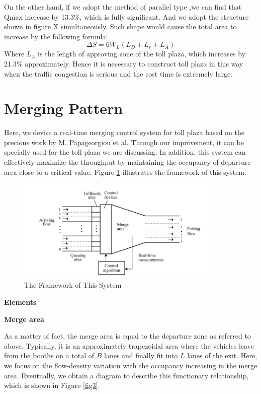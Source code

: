 \documentclass{mcmthesis}
\begin{document}
On the other hand, if we adopt the method
of parallel type ,we can find that Qmax
increase by 13.3\%, which is fully significant.
And we adopt the structure shown in figure X
simultaneously. Such shape would cause the total
area to increase by the following formula:
$$\Delta S=6W_{L}(L_D+L_r+L_A)$$
Where $L_{A}$ is the length of approving zone of
the toll plaza, which increases by 21.3\% approximately. Hence it is necessary to construct
toll plaza in this way when the traffic congestion
is serious and the cost time is extremely large.


\section{Merging Pattern}

Here, we devise a real-time merging control system for
toll plaza based on the precious work by M. Papageorgiou
et al. Through our improvement, it can be specially used
for the toll plaza we are discussing. In addition, this
system can effectively maximize the throughput by
maintaining the occupancy of departure area close to a
critical value. Figure \ref{fig2} illustrates the framework of
this system.

\begin{figure}[h]
\small
\centering
\includegraphics[width=10cm]{figure2}
\caption{The Framework of This System}\label{fig2}
\end{figure}

\textbf{Elements}

\textbf{Merge area}

As a matter of fact, the merge area is equal to the
departure zone as referred to above. Typically, it
is an approximately trapezoidal area where the vehicles
leave from the booths on a total of $B$ lanes and finally
fit into $L$ lanes of the exit. Here, we focus on the
flow-density variation with the occupancy increasing
in the merge area. Eventually, we obtain a diagram to
describe this functionary relationship, which is shown
in Figure \ref{fig3}.
\end{document}
